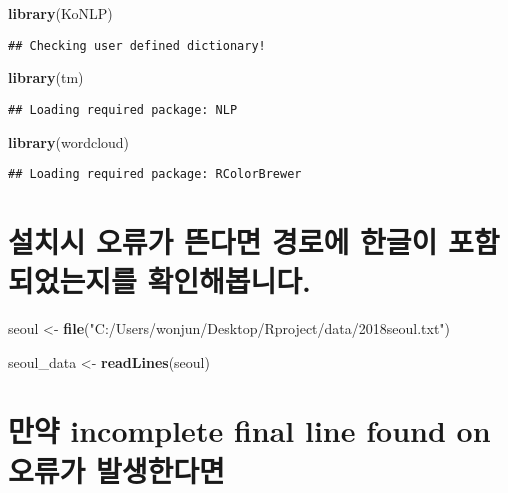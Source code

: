 \documentclass[]{article}
\title{}
\author{}
\date{}
\newenvironment{Shaded}{\begin{snugshade}}{\end{snugshade}}
\newcommand{\KeywordTok}[1]{\textcolor[rgb]{0.13,0.29,0.53}{\textbf{#1}}}
\newcommand{\StringTok}[1]{\textcolor[rgb]{0.31,0.60,0.02}{#1}}
\newcommand{\NormalTok}[1]{#1}
\begin{document}
\begin{Shaded}
\begin{Highlighting}[]
\KeywordTok{library}\NormalTok{(KoNLP)}
\end{Highlighting}
\end{Shaded}

\begin{verbatim}
## Checking user defined dictionary!
\end{verbatim}

\begin{Shaded}
\begin{Highlighting}[]
\KeywordTok{library}\NormalTok{(tm)}
\end{Highlighting}
\end{Shaded}

\begin{verbatim}
## Loading required package: NLP
\end{verbatim}

\begin{Shaded}
\begin{Highlighting}[]
\KeywordTok{library}\NormalTok{(wordcloud)}
\end{Highlighting}
\end{Shaded}

\begin{verbatim}
## Loading required package: RColorBrewer
\end{verbatim}

\section{설치시 오류가 뜬다면 경로에 한글이 포함되었는지를
확인해봅니다.}\label{------.}

\begin{Shaded}
\begin{Highlighting}[]
\NormalTok{seoul <-}\StringTok{ }\KeywordTok{file}\NormalTok{(}\StringTok{"C:/Users/wonjun/Desktop/Rproject/data/2018seoul.txt"}\NormalTok{)}
\end{Highlighting}
\end{Shaded}

\begin{Shaded}
\begin{Highlighting}[]
\NormalTok{seoul_data <-}\StringTok{ }\KeywordTok{readLines}\NormalTok{(seoul)}
\end{Highlighting}
\end{Shaded}

\section{만약 incomplete final line found on 오류가
발생한다면}\label{-incomplete-final-line-found-on--}
\end{document}

